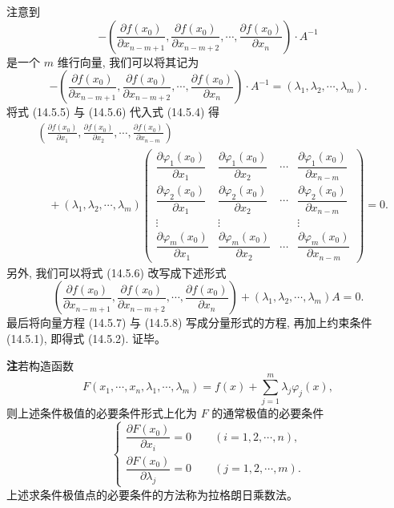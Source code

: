 \documentclass[UTF8,12pt,a4paper,fontset=fandol]{ctexart}
\begin{document}
注意到
\[
  -
  \left(
    \frac{\partial f(x_0)}{\partial x_{n-m+1}},
    \frac{\partial f(x_0)}{\partial x_{n-m+2}},
    \cdots,
    \frac{\partial f(x_0)}{\partial x_n}
  \right)\cdot A^{-1}
\]
是一个 $m$ 维行向量, 我们可以将其记为
\begin{equation}
  -
  \left(
    \frac{\partial f(x_0)}{\partial x_{n-m+1}},
    \frac{\partial f(x_0)}{\partial x_{n-m+2}},
    \cdots,
    \frac{\partial f(x_0)}{\partial x_n}
  \right)\cdot A^{-1}
  =(\lambda_1,\lambda_2,\cdots,\lambda_m).
  \tag{14.5.6}
\end{equation}
将式 (14.5.5) 与 (14.5.6) 代入式 (14.5.4) 得
\begin{equation}
\begin{aligned}
  &\left(
    \frac{\partial f(x_0)}{\partial x_1},
    \frac{\partial f(x_0)}{\partial x_2},
    \cdots,
    \frac{\partial f(x_0)}{\partial x_{n-m}}
  \right)\\
  &\quad+
  (\lambda_1,\lambda_2,\cdots,\lambda_m)
  \begin{pmatrix}
    \dfrac{\partial\varphi_1(x_0)}{\partial x_1} &
    \dfrac{\partial\varphi_1(x_0)}{\partial x_2} &
    \cdots &
    \dfrac{\partial\varphi_1(x_0)}{\partial x_{n-m}}\\
    \dfrac{\partial\varphi_2(x_0)}{\partial x_1} &
    \dfrac{\partial\varphi_2(x_0)}{\partial x_2} &
    \cdots &
    \dfrac{\partial\varphi_2(x_0)}{\partial x_{n-m}}\\
    \vdots & \vdots & & \vdots\\
    \dfrac{\partial\varphi_m(x_0)}{\partial x_1} &
    \dfrac{\partial\varphi_m(x_0)}{\partial x_2} &
    \cdots &
    \dfrac{\partial\varphi_m(x_0)}{\partial x_{n-m}}
  \end{pmatrix}
  =0.
\end{aligned}
\tag{14.5.7}
\end{equation}
另外, 我们可以将式 (14.5.6) 改写成下述形式
\begin{equation}
  \left(
    \frac{\partial f(x_0)}{\partial x_{n-m+1}},
    \frac{\partial f(x_0)}{\partial x_{n-m+2}},
    \cdots,
    \frac{\partial f(x_0)}{\partial x_n}
  \right)
  +
  (\lambda_1,\lambda_2,\cdots,\lambda_m)
  A=0.
  \tag{14.5.8}
\end{equation}
最后将向量方程 (14.5.7) 与 (14.5.8) 写成分量形式的方程, 再加上约束条件 (14.5.1), 即得式 (14.5.2). 证毕。

\noindent\textbf{注}\quad 若构造函数
\[
  F(x_1,\cdots,x_n,\lambda_1,\cdots,\lambda_m)
  =
  f(x)+\sum_{j=1}^m\lambda_j\varphi_j(x),
\]
则上述条件极值的必要条件形式上化为 $F$ 的通常极值的必要条件
\begin{equation}
  \begin{cases}
    \dfrac{\partial F(x_0)}{\partial x_i}=0
    \qquad (i=1,2,\cdots,n),\\[1.2ex]
    \dfrac{\partial F(x_0)}{\partial\lambda_j}=0
    \qquad (j=1,2,\cdots,m).
  \end{cases}
  \tag{14.5.9}
\end{equation}
上述求条件极值点的必要条件的方法称为拉格朗日乘数法。
\end{document}
